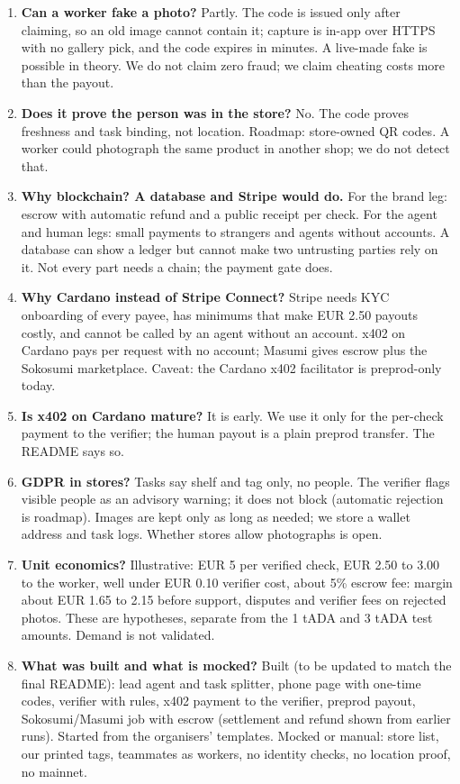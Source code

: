\begin{enumerate}
  \item \textbf{Can a worker fake a photo?} Partly. The code is issued only after claiming, so an old image cannot contain it; capture is in-app over HTTPS with no gallery pick, and the code expires in minutes. A live-made fake is possible in theory. We do not claim zero fraud; we claim cheating costs more than the payout.
  \item \textbf{Does it prove the person was in the store?} No. The code proves freshness and task binding, not location. Roadmap: store-owned QR codes. A worker could photograph the same product in another shop; we do not detect that.
  \item \textbf{Why blockchain? A database and Stripe would do.} For the brand leg: escrow with automatic refund and a public receipt per check. For the agent and human legs: small payments to strangers and agents without accounts. A database can show a ledger but cannot make two untrusting parties rely on it. Not every part needs a chain; the payment gate does.
  \item \textbf{Why Cardano instead of Stripe Connect?} Stripe needs KYC onboarding of every payee, has minimums that make EUR 2.50 payouts costly, and cannot be called by an agent without an account. x402 on Cardano pays per request with no account; Masumi gives escrow plus the Sokosumi marketplace. Caveat: the Cardano x402 facilitator is preprod-only today.
  \item \textbf{Is x402 on Cardano mature?} It is early. We use it only for the per-check payment to the verifier; the human payout is a plain preprod transfer. The README says so.
  \item \textbf{GDPR in stores?} Tasks say shelf and tag only, no people. The verifier flags visible people as an advisory warning; it does not block (automatic rejection is roadmap). Images are kept only as long as needed; we store a wallet address and task logs. Whether stores allow photographs is open.
  \item \textbf{Unit economics?} Illustrative: EUR 5 per verified check, EUR 2.50 to 3.00 to the worker, well under EUR 0.10 verifier cost, about 5\% escrow fee: margin about EUR 1.65 to 2.15 before support, disputes and verifier fees on rejected photos. These are hypotheses, separate from the 1 tADA and 3 tADA test amounts. Demand is not validated.
  \item \textbf{What was built and what is mocked?} Built (to be updated to match the final README): lead agent and task splitter, phone page with one-time codes, verifier with rules, x402 payment to the verifier, preprod payout, Sokosumi/Masumi job with escrow (settlement and refund shown from earlier runs). Started from the organisers' templates. Mocked or manual: store list, our printed tags, teammates as workers, no identity checks, no location proof, no mainnet.
\end{enumerate}

